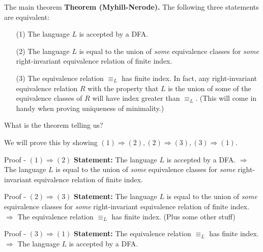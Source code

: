 \documentclass[10pt]{beamer}
\begin{document}
\begin{frame}{The main theorem}
    \textbf{Theorem (Myhill-Nerode).} The following three statements are equivalent:
    \begin{itemize}
        \item[(1)] The language $L$ is accepted by a DFA.
        \item[(2)] The language $L$ is equal to the union of \textit{some} equivalence classes for \textit{some} right-invariant equivalence relation of finite index.
        \item[(3)] The equivalence relation $\equiv_L$ has finite index. In fact, any right-invariant equivalence relation $R$ with the property that $L$ is the union of some of the equivalence classes of $R$ will have index greater than $\equiv_L$. (This will come in handy when proving uniqueness of minimality.)
    \end{itemize}

    What is the theorem telling us?

    \vspace{3em}

    We will prove this by showing $(1) \Rightarrow (2), (2) \Rightarrow (3), (3) \Rightarrow (1)$.

\end{frame}

\begin{frame}[t]{Proof - $(1) \Rightarrow (2)$}
    \textbf{Statement:} The language $L$ is accepted by a DFA. $\Rightarrow$ The language $L$ is equal to the union of \textit{some} equivalence classes for \textit{some} right-invariant equivalence relation of finite index.

\end{frame}

\begin{frame}[t]{Proof - $(2) \Rightarrow (3)$}
    \textbf{Statement:} The language $L$ is equal to the union of \textit{some} equivalence classes for \textit{some} right-invariant equivalence relation of finite index. $\Rightarrow$ The equivalence relation $\equiv_L$ has finite index. (Plus some other stuff)

\end{frame}

\begin{frame}[t]{Proof - $(3) \Rightarrow (1)$}
    \textbf{Statement:} The equivalence relation $\equiv_L$ has finite index. $\Rightarrow$ The language $L$ is accepted by a DFA.

\end{frame}
\end{document}
